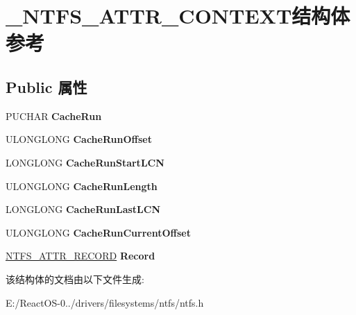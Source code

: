 \hypertarget{struct___n_t_f_s___a_t_t_r___c_o_n_t_e_x_t}{}\section{\+\_\+\+N\+T\+F\+S\+\_\+\+A\+T\+T\+R\+\_\+\+C\+O\+N\+T\+E\+X\+T结构体 参考}
\label{struct___n_t_f_s___a_t_t_r___c_o_n_t_e_x_t}
\subsection*{Public 属性}
\begin{DoxyCompactItemize}
\item 
\mbox{\label{struct___n_t_f_s___a_t_t_r___c_o_n_t_e_x_t_a871aa2ec47f431893ed8a06b9a4449d6}} 
P\+U\+C\+H\+AR {\bfseries Cache\+Run}
\item 
\mbox{\label{struct___n_t_f_s___a_t_t_r___c_o_n_t_e_x_t_a0391447a55185f3ef7e2adf20e2631c4}} 
U\+L\+O\+N\+G\+L\+O\+NG {\bfseries Cache\+Run\+Offset}
\item 
\mbox{\label{struct___n_t_f_s___a_t_t_r___c_o_n_t_e_x_t_adbad4e00e77ed143eb07e1f9c7310ac5}} 
L\+O\+N\+G\+L\+O\+NG {\bfseries Cache\+Run\+Start\+L\+CN}
\item 
\mbox{\label{struct___n_t_f_s___a_t_t_r___c_o_n_t_e_x_t_a45d15b17344c45a743769c35f1d0802d}} 
U\+L\+O\+N\+G\+L\+O\+NG {\bfseries Cache\+Run\+Length}
\item 
\mbox{\label{struct___n_t_f_s___a_t_t_r___c_o_n_t_e_x_t_a7125ed3fc89c5e6883f2648d5369dd2d}} 
L\+O\+N\+G\+L\+O\+NG {\bfseries Cache\+Run\+Last\+L\+CN}
\item 
\mbox{\label{struct___n_t_f_s___a_t_t_r___c_o_n_t_e_x_t_aeb1e2d14f3e85e12c538ecbdc687c58e}} 
U\+L\+O\+N\+G\+L\+O\+NG {\bfseries Cache\+Run\+Current\+Offset}
\item 
\mbox{\label{struct___n_t_f_s___a_t_t_r___c_o_n_t_e_x_t_a9205fc1e80dad7567414f114da6e1900}} 
\hyperlink{struct_n_t_f_s___a_t_t_r___r_e_c_o_r_d}{N\+T\+F\+S\+\_\+\+A\+T\+T\+R\+\_\+\+R\+E\+C\+O\+RD} {\bfseries Record}
\end{DoxyCompactItemize}


该结构体的文档由以下文件生成\+:\begin{DoxyCompactItemize}
\item 
E\+:/\+React\+O\+S-\/0../drivers/filesystems/ntfs/ntfs.\+h\end{DoxyCompactItemize}
